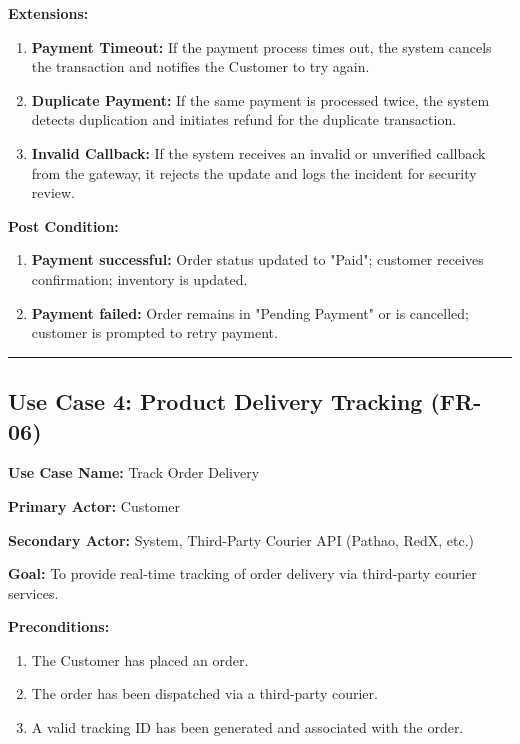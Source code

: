 \textbf{Extensions:}
\begin{enumerate}
    \item[3a.] \textbf{Payment Timeout:} If the payment process times out, the system cancels the transaction and notifies the Customer to try again.
    \item[3b.] \textbf{Duplicate Payment:} If the same payment is processed twice, the system detects duplication and initiates refund for the duplicate transaction.
    \item[3c.] \textbf{Invalid Callback:} If the system receives an invalid or unverified callback from the gateway, it rejects the update and logs the incident for security review.
\end{enumerate}

\textbf{Post Condition:}
\begin{enumerate}
    \item \textbf{Payment successful:} Order status updated to "Paid"; customer receives confirmation; inventory is updated.
    \item \textbf{Payment failed:} Order remains in "Pending Payment" or is cancelled; customer is prompted to retry payment.
\end{enumerate}

\vspace{0.5cm}
\hrule
\vspace{0.5cm}

\subsection*{Use Case 4: Product Delivery Tracking (FR-06)}

\textbf{Use Case Name:} Track Order Delivery

\textbf{Primary Actor:} Customer

\textbf{Secondary Actor:} System, Third-Party Courier API (Pathao, RedX, etc.)

\textbf{Goal:} To provide real-time tracking of order delivery via third-party courier services.

\textbf{Preconditions:}
\begin{enumerate}
    \item The Customer has placed an order.
    \item The order has been dispatched via a third-party courier.
    \item A valid tracking ID has been generated and associated with the order.
\end{enumerate}

